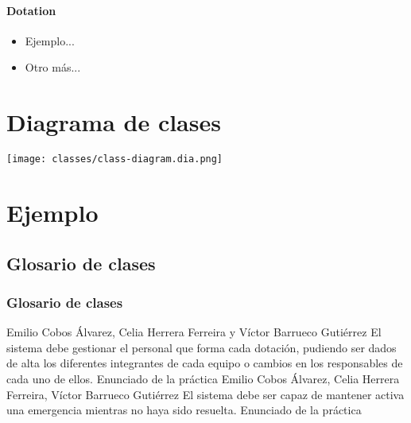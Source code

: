 \paragraph{Dotation}
\begin{itemize}
    \item Ejemplo...
    \item Otro más...
\end{itemize}
\section{Diagrama de clases}
\texttt{[image: classes/class-diagram.dia.png]}

\section{Ejemplo}
\subsection{Glosario de clases}
\subsubsection{Glosario de clases}
{Emilio Cobos Álvarez, Celia Herrera Ferreira y Víctor Barrueco Gutiérrez}
{El sistema debe gestionar el personal que forma cada dotación, pudiendo ser dados de alta los diferentes integrantes de cada equipo o cambios en los responsables de cada uno de ellos.}
{Enunciado de la práctica}
{Emilio Cobos Álvarez, Celia Herrera Ferreira, Víctor Barrueco Gutiérrez}
{El sistema debe ser capaz de mantener activa una emergencia mientras no haya sido resuelta.}
{Enunciado de la práctica}

